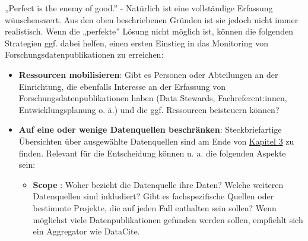 \documentclass[
  ngerman,
  letterpaper,
  DIV=11]{scrreprt}
\providecommand{\tightlist}{%
  \setlength{\itemsep}{0pt}\setlength{\parskip}{0pt}}
\begin{document}
\begin{tcolorbox}[enhanced jigsaw, arc=.35mm, bottomrule=.15mm, bottomtitle=1mm, breakable, colback=white, colbacktitle=quarto-callout-tip-color!10!white, colframe=quarto-callout-tip-color-frame, coltitle=black, left=2mm, leftrule=.75mm, opacityback=0, opacitybacktitle=0.6, rightrule=.15mm, title=\textcolor{quarto-callout-tip-color}{\faLightbulb}\hspace{0.5em}{Infobox: Welche Optionen existieren bei beschränkten oder unklaren
Ressourcen?}, titlerule=0mm, toprule=.15mm, toptitle=1mm]

„Perfect is the enemy of good.'' - Natürlich ist eine vollständige
Erfassung wünschenswert. Aus den oben beschriebenen Gründen ist sie
jedoch nicht immer realistisch. Wenn die „perfekte'' Lösung nicht
möglich ist, können die folgenden Strategien ggf. dabei helfen, einen
ersten Einstieg in das Monitoring von Forschungsdatenpublikationen zu
erreichen:

\begin{itemize}
\tightlist
\item
  \textbf{Ressourcen mobilisieren}: Gibt es Personen oder Abteilungen an
  der Einrichtung, die ebenfalls Interesse an der Erfassung von
  Forschungsdatenpublikationen haben (Data Stewards, Fachreferent:innen,
  Entwicklungsplanung o. ä.) und die ggf. Ressourcen beisteuern können?
\item
  \textbf{Auf eine oder wenige Datenquellen beschränken}:
  Steckbriefartige Übersichten über ausgewählte Datenquellen sind am
  Ende von \href{./3_Durchführung.qmd}{Kapitel 3} zu finden. Relevant
  für die Entscheidung können u. a. die folgenden Aspekte sein:

  \begin{itemize}
  \tightlist
  \item
    \textbf{Scope} \footnotemark{}: Woher bezieht die Datenquelle ihre
    Daten? Welche weiteren Datenquellen sind inkludiert? Gibt es
    fachspezifische Quellen oder bestimmte Projekte, die auf jeden Fall
    enthalten sein sollen? Wenn möglichst viele Datenpublikationen
    gefunden werden sollen, empfiehlt sich ein Aggregator wie DataCite.


\end{itemize}
\end{itemize}
\end{tcolorbox}
\end{document}
